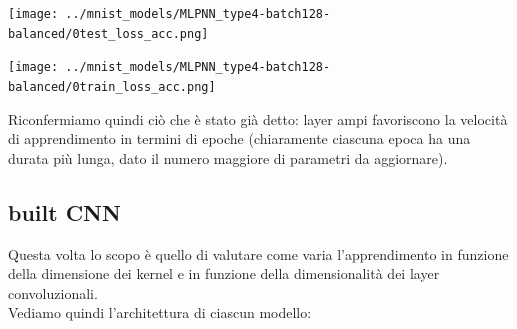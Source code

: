\documentclass[12pt]{article}
\begin{document}
\begin{multicols}{2}
    \noindent
    \begin{minipage}{\linewidth}
        \centering
        \texttt{[image: ../mnist\_models/MLPNN\_type4-batch128-balanced/0test\_loss\_acc.png]}
        \label{fig:cc}
    \end{minipage}
    \bigskip

    \noindent
    \begin{minipage}{\linewidth}
        \centering
        \texttt{[image: ../mnist\_models/MLPNN\_type4-batch128-balanced/0train\_loss\_acc.png]}
        \label{fig:cc}
    \end{minipage}
    \bigskip
\end{multicols}

Riconfermiamo quindi ciò che è stato già detto: layer ampi favoriscono
la velocità di apprendimento in termini di epoche (chiaramente ciascuna
epoca ha una durata più lunga, dato il numero maggiore di parametri
da aggiornare).


\newpage
\subsection{built CNN}

Questa volta lo scopo è quello di valutare come varia l'apprendimento
in funzione della dimensione dei kernel e in funzione della
dimensionalità dei layer convoluzionali.\\

Vediamo quindi l'architettura di ciascun modello:
\end{document}
